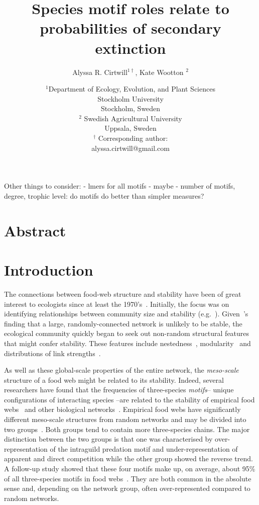 \documentclass[12pt]{article}
\title{Species motif roles relate to probabilities of secondary extinction}
\author{Alyssa R. Cirtwill$^{1\dagger}$, Kate Wootton $^{2}$}
\date{\small$^1$Department of Ecology, Evolution, and Plant Sciences\\ 
Stockholm University\\
Stockholm, Sweden\\
\medskip
\small$^2$ Swedish Agricultural University\\
Uppsala, Sweden\\
\medskip
$^\dagger$ Corresponding author:\\
alyssa.cirtwill@gmail.com\\
 }
\begin{document}
 
\maketitle 
\raggedright
\setlength{\parindent}{15pt} 


Other things to consider:
- lmers for all motifs
- maybe %
- number of motifs, degree, trophic level: do motifs do better than simpler measures?




\section*{Abstract}


\section*{Introduction}

	The connections between food-web structure and stability have been of great interest to ecologists since at least the 1970's~\citep{May1972}. Initially, the focus was on identifying relationships between community size and stability (e.g.~\citealp{Gardner1970,May1972}). Given~\citet{May1972}'s finding that a large, randomly-connected network is unlikely to be stable, the ecological community quickly began to seek out non-random structural features that might confer stability. These features include nestedness~\citep{}, modularity~\citep{} and distributions of link strengths~\citep{McCann1998,Gross2009,Rooney2012,Wootton2016}. 


	As well as these global-scale properties of the entire network, the \emph{meso-scale} structure of a food web might be related to its stability. Indeed, several researchers have found that the frequencies of three-species \emph{motifs}-- unique configurations of interacting species --are related to the stability of empirical food webs~\citep{Stouffer2007,Borrelli2015,Monteiro2016} and other biological networks~\citep{Prill2005}. Empirical food webs have significantly different meso-scale structures from random networks and may be divided into two groups~\citep{Stouffer2007}. Both groups tend to contain more three-species chains. The major distinction between the two groups is that one was characterised by over-representation of the intraguild predation motif and under-representation of apparent and direct competition while the other group showed the reverse trend. A follow-up study showed that these four motifs make up, on average, about 95\% of all three-species motifs in food webs~\citep{Stouffer2010b}. They are both common in the absolute sense and, depending on the network group, often over-represented compared to random networks.
\end{document}
